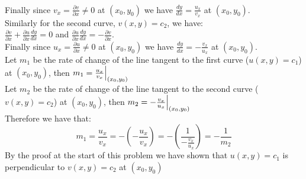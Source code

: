 \documentclass{article}
\begin{document}
\begin{center}
    \\Finally since $v_x =\frac{\partial v}{\partial x}\neq 0$ at $(x_0, y_0)$ we have $\frac{dy}{dx} =\frac{u_x}{v_x}$ at $(x_0, y_0)$.
    \break
    \\Similarly for the second curve, $v(x, y) = c_2$, we have:
    \\$\frac{\partial v}{\partial x} +\frac{\partial u}{\partial x}\frac{dy}{dx} = 0$ and $\frac{\partial u}{\partial x}\frac{dy}{dx} = -\frac{\partial v}{\partial x}$.
    \\Finally since $u_x =\frac{\partial u}{\partial x}\neq 0$ at $(x_0, y_0)$ we have $\frac{dy}{dx} =-\frac{v_x}{u_x}$ at $(x_0, y_0)$.
    \break
    \\Let $m_1$ be the rate of change of the line tangent to the first curve ($u(x, y) = c_1$) at $(x_0, y_0)$, then $m_1 =\frac{u_x}{v_x}\Big{|}_{(x_0, y_0)}$
    \break
    \\Let $m_2$ be the rate of change of the line tangent to the second curve ($v(x, y) = c_2$) at $(x_0, y_0)$, then $m_2 =-\frac{v_x}{u_x}\Big{|}_{(x_0, y_0)}$
    \\Therefore we have that:
    \[m_1 =\frac{u_x}{v_x} = -(-\frac{u_x}{v_x}) = -(\frac{1}{-\frac{v_x}{u_x}}) = -\frac{1}{m_2}\]
    By the proof at the start of this problem we have shown that $u(x, y) = c_1$ is perpendicular to $v(x, y) = c_2$ at $(x_0, y_0)$ \qedsymbol
\end{center}


\newpage
\end{document}
